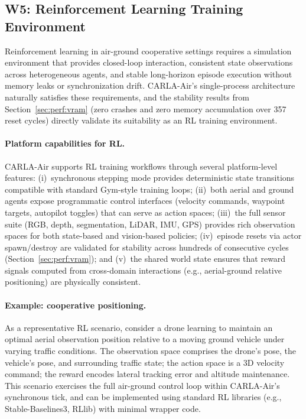 \subsection{W5: Reinforcement Learning Training Environment}
\label{sec:apps:rl}

Reinforcement learning in air-ground cooperative settings requires a simulation
environment that provides closed-loop interaction, consistent state
observations across heterogeneous agents, and stable long-horizon episode
execution without memory leaks or synchronization drift.
CARLA-Air's single-process architecture naturally satisfies these requirements,
and the stability results from Section~\ref{sec:perf:vram} (zero crashes and
zero memory accumulation over 357 reset cycles) directly validate its
suitability as an RL training environment.

\paragraph{Platform capabilities for RL.}
CARLA-Air supports RL training workflows through several platform-level
features:
(i)~synchronous stepping mode provides deterministic state transitions
compatible with standard Gym-style training loops;
(ii)~both aerial and ground agents expose programmatic control interfaces (velocity
commands, waypoint targets, autopilot toggles) that can serve as action spaces;
(iii)~the full sensor suite (RGB, depth, segmentation, LiDAR, IMU, GPS)
provides rich observation spaces for both state-based and vision-based policies;
(iv)~episode resets via actor spawn/destroy are validated for stability across
hundreds of consecutive cycles (Section~\ref{sec:perf:vram});
and (v)~the shared world state ensures that reward signals computed from
cross-domain interactions (e.g., aerial-ground relative positioning) are
physically consistent.

\paragraph{Example: cooperative positioning.}
As a representative RL scenario, consider a drone learning to maintain an
optimal aerial observation position relative to a moving ground vehicle under
varying traffic conditions.
The observation space comprises the drone's pose, the vehicle's pose, and
surrounding traffic state; the action space is a 3D velocity command; the reward
encodes lateral tracking error and altitude maintenance.
This scenario exercises the full air-ground control loop within CARLA-Air's
synchronous tick, and can be implemented using standard RL libraries (e.g.,
Stable-Baselines3, RLlib) with minimal wrapper code.


